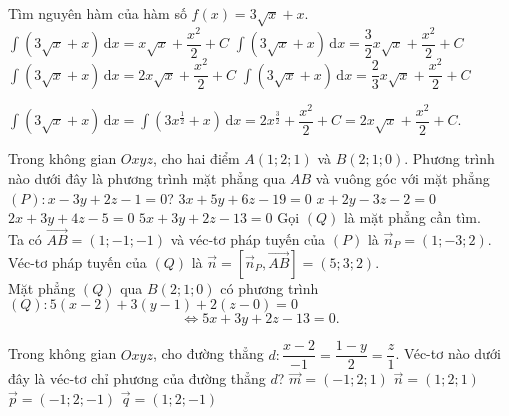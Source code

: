 \begin{ex}%
	Tìm nguyên hàm của hàm số $f(x)=3\sqrt{x}+x$.
	\choice
	{$\displaystyle\int \left(3\sqrt{x}+x\right)\mathrm{\,d}x=x\sqrt{x}+\dfrac{x^2}{2}+C$}
	{$\displaystyle\int \left(3\sqrt{x}+x\right)\mathrm{\,d}x=\dfrac{3}{2}x\sqrt{x}+\dfrac{x^2}{2}+C$}
	{\True $\displaystyle\int \left(3\sqrt{x}+x\right)\mathrm{\,d}x=2x\sqrt{x}+\dfrac{x^2}{2}+C$}
	{$\displaystyle\int \left(3\sqrt{x}+x\right)\mathrm{\,d}x=\dfrac{2}{3}x\sqrt{x}+\dfrac{x^2}{2}+C$}
	\loigiai
	{
		$
		\displaystyle\int \left(3\sqrt{x}+x\right)\mathrm{\,d}x
		 =\displaystyle\int \left(3x^{\tfrac{1}{2}}+x\right)\mathrm{\,d}x
		 =2x^{\tfrac{3}{2}}+\dfrac{x^2}{2}+C
		=2x\sqrt{x}+\dfrac{x^2}{2}+C.
		$
		
	}
\end{ex}

\begin{ex}%
	Trong không gian $Oxyz$, cho hai điểm $A(1;2;1)$ và $B(2;1;0)$. Phương trình nào dưới đây là phương trình mặt phẳng qua $AB$ và vuông góc với mặt phẳng $(P): x-3y+2z-1=0$?
	\choice
	{$3x+5y+6z-19=0$}
	{$x+2y-3z-2=0$}
	{$2x+3y+4z-5=0$}
	{\True $5x+3y+2z-13=0$}
	\loigiai
	{
		Gọi $(Q)$ là mặt phẳng cần tìm.\\
		Ta có $\vec{AB}=(1;-1;-1)$ và véc-tơ pháp tuyến của $(P)$ là $\vec{n}_P=(1;-3;2)$.\\ 
		Véc-tơ pháp tuyến của $(Q)$ là $\vec{n}=\left[\vec{n}_P,\vec{AB}\right]=(5;3;2)$.\\
		Mặt phẳng $(Q)$ qua $B(2;1;0)$ có phương trình $(Q):5(x-2)+3(y-1)+2(z-0)=0$\vspace{-2ex}
		$$\Leftrightarrow5x+3y+2z-13=0.$$\vspace{-6ex}
	}
\end{ex}

\begin{ex}%
	Trong không gian $Oxyz$, cho đường thẳng $d:\dfrac{x-2}{-1}=\dfrac{1-y}{2}=\dfrac{z}{1}$. Véc-tơ nào dưới đây là véc-tơ chỉ phương của đường thẳng $d$?
	\choice
	{$\vec{m}=(-1;2;1)$}
	{$\vec{n}=(1;2;1)$}
	{$\vec{p}=(-1;2;-1)$}
	{\True $\vec{q}=(1;2;-1)$}
\end{ex}

